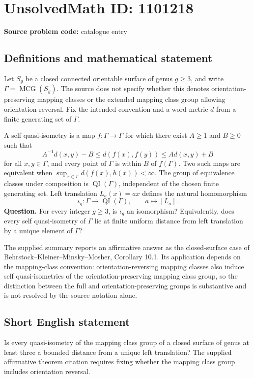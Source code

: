 \documentclass[11pt]{article}
\begin{document}
\section*{UnsolvedMath ID: 1101218}
\textbf{Source problem code:} catalogue entry
\subsection{Definitions and mathematical statement}
Let $S_g$ be a closed connected orientable surface of genus $g\geq3$, and write $\Gamma=\operatorname{MCG}(S_g)$. The source does not specify whether this denotes orientation-preserving mapping classes or the extended mapping class group allowing orientation reversal. Fix the intended convention and a word metric $d$ from a finite generating set of $\Gamma$.

A self quasi-isometry is a map $f:\Gamma\to\Gamma$ for which there exist $A\geq1$ and $B\geq0$ such that
\[
A^{-1}d(x,y)-B\leq d(f(x),f(y))\leq A d(x,y)+B
\]
for all $x,y\in\Gamma$, and every point of $\Gamma$ is within $B$ of $f(\Gamma)$. Two such maps are equivalent when $\sup_{x\in\Gamma}d(f(x),h(x))<\infty$. The group of equivalence classes under composition is $\operatorname{QI}(\Gamma)$, independent of the chosen finite generating set. Left translation $L_a(x)=ax$ defines the natural homomorphism
\[
\iota_g:\Gamma\longrightarrow\operatorname{QI}(\Gamma),\qquad a\longmapsto[L_a].
\]
\textbf{Question.} For every integer $g\geq3$, is $\iota_g$ an isomorphism? Equivalently, does every self quasi-isometry of $\Gamma$ lie at finite uniform distance from left translation by a unique element of $\Gamma$?

The supplied summary reports an affirmative answer as the closed-surface case of Behrstock--Kleiner--Minsky--Mosher, Corollary 10.1. Its application depends on the mapping-class convention: orientation-reversing mapping classes also induce self quasi-isometries of the orientation-preserving mapping class group, so the distinction between the full and orientation-preserving groups is substantive and is not resolved by the source notation alone.
\subsection{Short English statement}
Is every quasi-isometry of the mapping class group of a closed surface of genus at least three a bounded distance from a unique left translation? The supplied affirmative theorem citation requires fixing whether the mapping class group includes orientation reversal.
\end{document}
